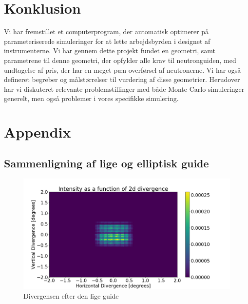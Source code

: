 \documentclass[12pt,oneside,a4paper]{article}
\begin{document}
{{{{{\section{Konklusion}
Vi har fremstillet et computerprogram, der automatisk optimerer på parameteriserede simuleringer for at lette arbejdsbyrden i designet af instrumenterne. Vi har gennem dette projekt fundet en geometri, samt parametrene til denne geometri, der opfylder alle krav til neutronguiden, med undtagelse af pris, der har en meget pæn overførsel af neutronerne. Vi har også defineret begreber og målstørrelser til vurdering af disse geometrier. Herudover har vi diskuteret relevante problemstillinger med både Monte Carlo simuleringer generelt, men også problemer i vores specifikke simulering. 


\newpage

 

\newpage

\appendix
\section{Appendix}

\subsection{Sammenligning af lige og elliptisk guide}

\begin{figure}[H]
\centering
\includegraphics[width=1\textwidth]{div_straight_after.png}
\caption{Divergensen efter den lige guide}  \label{ap:div_straight_after}
\end{figure}


}}}}}
\end{document}
